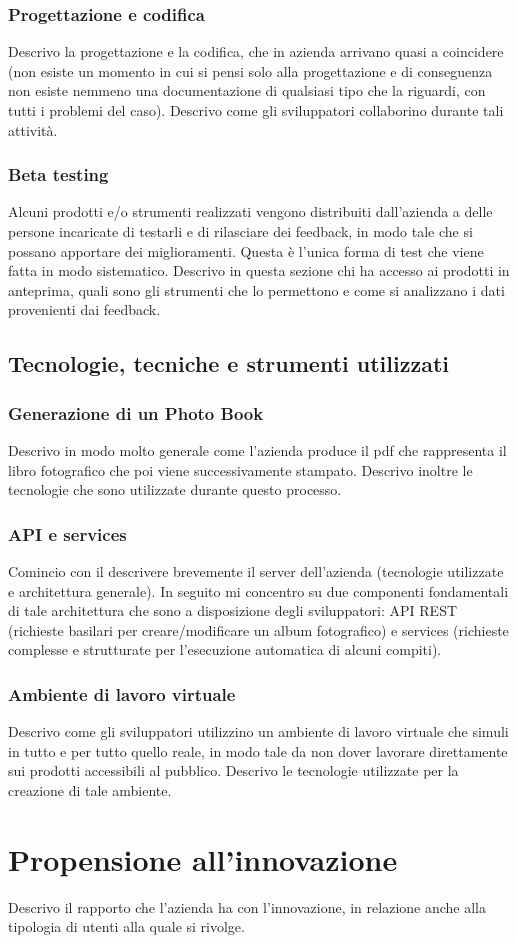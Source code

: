 			\subsubsection{Progettazione e codifica}
				Descrivo la progettazione e la codifica, che in azienda arrivano quasi a coincidere (non esiste un momento in cui
				si pensi solo alla progettazione e di conseguenza non esiste nemmeno una documentazione di qualsiasi tipo che la
				riguardi, con tutti i problemi del caso). Descrivo come gli sviluppatori collaborino durante tali attività.
			\subsubsection{Beta testing}
				Alcuni prodotti e/o strumenti realizzati vengono distribuiti dall'azienda a delle persone incaricate di testarli
				e di rilasciare dei feedback, in modo tale che si possano apportare dei miglioramenti. Questa è l'unica forma di
				test che viene fatta in modo sistematico. Descrivo in questa sezione chi ha accesso ai prodotti in anteprima, quali
				sono gli strumenti che lo permettono e come si analizzano i dati provenienti dai feedback.
		\subsection{Tecnologie, tecniche e strumenti utilizzati}
			\subsubsection{Generazione di un Photo Book}
				Descrivo in modo molto generale come l'azienda produce il pdf che rappresenta il libro fotografico che poi viene
				successivamente stampato. Descrivo inoltre le tecnologie che sono utilizzate durante questo processo.
			\subsubsection{API e services}
				Comincio con il descrivere brevemente il server dell'azienda (tecnologie utilizzate e architettura generale). In
				seguito mi concentro su due componenti fondamentali di tale architettura che sono a disposizione degli sviluppatori:
				API REST (richieste basilari per creare/modificare un album fotografico) e services (richieste complesse e
				strutturate per l'esecuzione automatica di alcuni compiti).
			\subsubsection{Ambiente di lavoro virtuale}
				Descrivo come gli sviluppatori utilizzino un ambiente di lavoro virtuale che simuli in tutto e per tutto quello
				reale, in modo tale da non dover lavorare direttamente sui prodotti accessibili al pubblico. Descrivo le tecnologie
				utilizzate per la creazione di tale ambiente.
	\section{Propensione all'innovazione}
		Descrivo il rapporto che l'azienda ha con l'innovazione, in relazione anche alla tipologia di utenti alla quale si rivolge.
